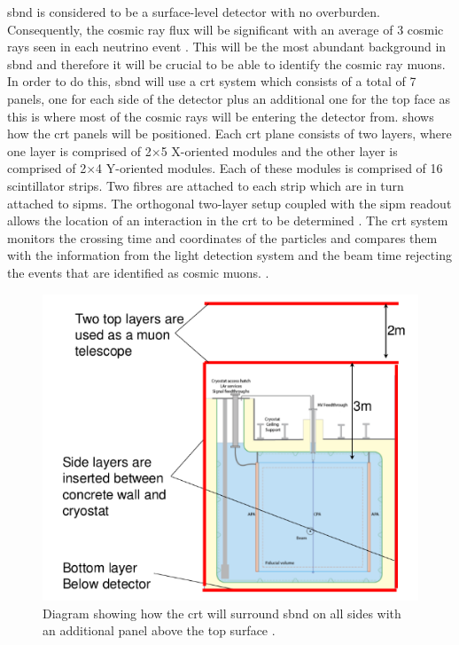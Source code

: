 \gls{sbnd} is considered to be a surface-level detector with no overburden. Consequently, the cosmic ray flux will be significant with an average of 3 cosmic rays seen in each neutrino event \cite{SBN_Proposal}. This will be the most abundant background in \gls{sbnd} and therefore it will be crucial to be able to identify the cosmic ray muons. In order to do this, \gls{sbnd} will use a \gls{crt} system which consists of a total of 7 panels, one for each side of the detector plus an additional one for the top face as this is where most of the cosmic rays will be entering the detector from.  shows how the \gls{crt} panels will be positioned. Each \gls{crt} plane consists of two layers, where one layer is comprised of 2$\times$5 X-oriented modules and the other layer is comprised of 2$\times$4 Y-oriented modules. Each of these modules is comprised of 16 scintillator strips. Two fibres are attached to each strip which are in turn attached to \glspl{sipm}. The orthogonal two-layer setup coupled with the \gls{sipm} readout allows the location of an interaction in the \gls{crt} to be determined \cite{sbnd_crt}. The \gls{crt} system monitors the crossing time and coordinates of the particles and compares them with the information from the light detection system and the beam time rejecting the events that are identified as cosmic muons. \cite{microboone_crt}.

\begin{figure}[!h]
    \centering
    \includegraphics[width = \largefigwidth]{figures-chap3/SBND_CRT.png}
    \caption[CRT positioning in SBND.]{Diagram showing how the \gls{crt} will surround \gls{sbnd} on all sides with an additional panel above the top surface \cite{SBN_Proposal}.}
    \label{fig:sbnd_crt}
\end{figure}

